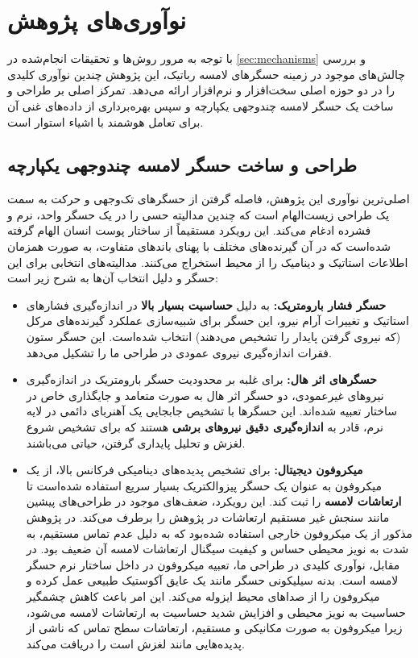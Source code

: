 \section{نوآوری‌های پژوهش}

با توجه به مرور روش‌ها و تحقیقات انجام‌شده در
\ref{sec:mechanisms}
 و بررسی چالش‌های موجود در زمینه حسگرهای لامسه رباتیک، این پژوهش چندین نوآوری کلیدی را در دو حوزه اصلی سخت‌افزار و نرم‌افزار ارائه می‌دهد. تمرکز اصلی بر طراحی و ساخت یک حسگر لامسه چندوجهی یکپارچه و سپس بهره‌برداری از داده‌های غنی آن برای تعامل هوشمند با اشیاء استوار است.

\subsection{طراحی و ساخت حسگر لامسه چندوجهی یکپارچه}

اصلی‌ترین نوآوری این پژوهش، فاصله گرفتن از حسگرهای تک‌وجهی و حرکت به سمت یک طراحی زیست‌الهام 
است که چندین مدالیته حسی را در یک حسگر واحد، نرم و فشرده ادغام می‌کند. این رویکرد مستقیماً از ساختار پوست انسان الهام گرفته شده‌است که در آن گیرنده‌های مختلف با پهنای باندهای متفاوت، به صورت همزمان اطلاعات استاتیک و دینامیک را از محیط استخراج می‌کنند. مدالیته‌های انتخابی برای این حسگر و دلیل انتخاب آن‌ها به شرح زیر است:

\begin{itemize}
	\item \textbf{حسگر فشار بارومتریک:} به دلیل \textbf{حساسیت بسیار بالا} در اندازه‌گیری فشارهای استاتیک و تغییرات آرام نیرو، این حسگر برای شبیه‌سازی عملکرد گیرنده‌های مرکل (که نیروی گرفتن پایدار را تشخیص می‌دهند) انتخاب شده‌است. این حسگر ستون فقرات اندازه‌گیری نیروی عمودی در طراحی ما را تشکیل می‌دهد.
	
	\item \textbf{حسگرهای اثر هال:} برای غلبه بر محدودیت حسگر بارومتریک در اندازه‌گیری نیروهای غیرعمودی، دو حسگر اثر هال به صورت  متعامد و جایگذاری خاص در ساختار تعبیه شده‌اند. این حسگرها با تشخیص جابجایی یک آهنربای دائمی در لایه نرم، قادر به \textbf{اندازه‌گیری دقیق نیروهای برشی} هستند که برای تشخیص شروع لغزش و تحلیل پایداری گرفتن، حیاتی می‌باشند.
	
	\item \textbf{میکروفون دیجیتال:} 
	برای تشخیص پدیده‌های دینامیکی فرکانس بالا، از یک میکروفون 
	به عنوان یک حسگر پیزوالکتریک بسیار سریع استفاده شده‌است تا \textbf{ارتعاشات لامسه} را ثبت کند. این رویکرد، ضعف‌های موجود در طراحی‌های پیشین مانند سنجش غیر مستقیم ارتعاشات در پژوهش 
	\cite{yu2023mimictouch}
	را برطرف می‌کند. در پژوهش مذکور از یک میکروفون خارجی استفاده شده‌بود که به دلیل عدم تماس مستقیم، به شدت به نویز محیطی حساس و کیفیت سیگنال ارتعاشات لامسه آن ضعیف بود. در مقابل، نوآوری کلیدی در طراحی ما، تعبیه میکروفون در داخل ساختار نرم حسگر لامسه است. بدنه سیلیکونی حسگر مانند یک عایق آکوستیک طبیعی عمل کرده و میکروفون را از صداهای محیط ایزوله می‌کند. این امر باعث کاهش چشمگیر حساسیت به نویز محیطی و افزایش شدید حساسیت به ارتعاشات لامسه می‌شود، زیرا میکروفون به صورت مکانیکی و مستقیم، ارتعاشات سطح تماس که ناشی از پدیده‌هایی مانند لغزش است را دریافت می‌کند.
\end{itemize}

